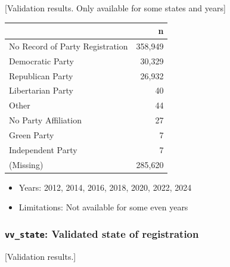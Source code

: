 \documentclass[10pt,article,oneside]{memoir}
\begin{document}
{[}Validation results. Only available for some states and years{]}

\begin{table}[H]
\centering
\begin{tabular}[t]{lr}
\toprule
 & n\\
\midrule
No Record of Party Registration & 358,949\\
Democratic Party & 30,329\\
Republican Party & 26,932\\
Libertarian Party & 40\\
Other & 44\\
No Party Affiliation & 27\\
Green Party & 7\\
Independent Party & 7\\
(Missing) & 285,620\\
\bottomrule
\end{tabular}
\end{table}

\begin{itemize}
\tightlist
\item
  Years: 2012, 2014, 2016, 2018, 2020, 2022, 2024
\item
  Limitations: Not available for some even years
\end{itemize}

\subsubsection{\texorpdfstring{\texttt{vv\_state}: Validated state of
registration}{vv\_state: Validated state of registration}}\label{vv_state-validated-state-of-registration}

{[}Validation results.{]}
\end{document}
